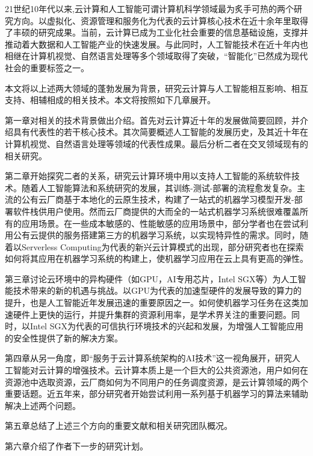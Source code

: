 
\begin{cabstract}
	21世纪10年代以来,云计算和人工智能可谓计算机科学领域最为炙手可热的两个研究方向。以虚拟化、资源管理和服务化为代表的云计算核心技术在近十余年里取得了丰硕的研究成果。当前，云计算已成为工业化社会重要的信息基础设施，支撑并推动着大数据和人工智能产业的快速发展。与此同时，人工智能技术在近十年内也相继在计算机视觉、自然语言处理等多个领域取得了突破，“智能化”已然成为现代社会的重要标签之一。
	
	本文将以上述两大领域的蓬勃发展为背景，研究云计算与人工智能相互影响、相互支持、相辅相成的相关技术。本文将按照如下几章展开。
	
	第一章对相关的技术背景做出介绍。首先对云计算近十年的发展做简要回顾，并介绍具有代表性的若干核心技术。其次简要概述人工智能的发展历史，及其近十年在计算机视觉、自然语言处理等领域的代表性成果。最后分析二者在交叉领域现有的相关研究。
	
	第二章开始探究二者的关系，研究云计算环境中用以支持人工智能的系统软件技术。随着人工智能算法和系统研究的发展，其训练-测试-部署的流程愈发复杂。主流的公有云厂商基于本地化的云原生技术，构建了一站式的机器学习模型开发-部署软件栈供用户使用。然而云厂商提供的大而全的一站式机器学习系统很难覆盖所有的应用场景。在一些成本敏感的、性能敏感的应用场景中，部分学者也在尝试利用公有云提供的服务搭建第三方的机器学习系统，以实现特异性的需求。同时，随着以Serverless Computing为代表的新兴云计算模式的出现，部分研究者也在探索如何将其应用在机器学习系统的构建上，使机器学习应用在云上具有更高的弹性。

	第三章讨论云环境中的异构硬件（如GPU，AI专用芯片，Intel SGX等）为人工智能技术带来的新的机遇与挑战。以GPU为代表的加速型硬件的发展导致的算力的提升，也是人工智能近年发展迅速的重要原因之一。如何使机器学习任务在这类加速硬件上更快的运行，并提升集群的资源利用率，是学术界关注的重要问题。同时，以Intel SGX为代表的可信执行环境技术的兴起和发展，为增强人工智能应用的安全性提供了新的解决方案。

	第四章从另一角度，即“服务于云计算系统架构的AI技术”这一视角展开，研究人工智能对云计算的增强技术。云计算本质上是一个巨大的公共资源池，用户如何在资源池中选取资源，云厂商如何为不同用户的任务调度资源，是云计算领域的两个重要话题。近五年来，部分研究者开始尝试利用一系列基于机器学习的算法来辅助解决上述两个问题。
	
	第五章总结了上述三个方向的重要文献和相关研究团队概况。
	
	第六章介绍了作者下一步的研究计划。

\end{cabstract}



